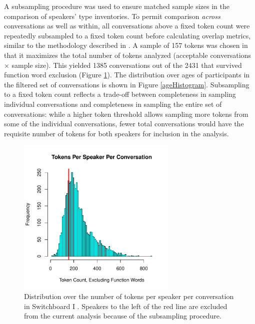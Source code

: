 \documentclass[10pt,letterpaper]{article}
\begin{document}
A subsampling procedure was used to ensure matched sample sizes in the comparison of speakers' type inventories. To permit comparison \textit{across} conversations as well as within, all conversations above a fixed token count were repeatedly subsampled to a fixed token count before calculating overlap metrics, similar to the methodology described in \citet{pineEtAl2013}. A sample of 157 tokens was chosen in that it maximizes the total number of tokens analyzed (acceptable conversations $\times$ sample size). This yielded 1385 conversations out of the 2431 that survived function word exclusion (Figure \ref{tokenHistogram}). The distribution over ages of participants in the filtered set of conversations is shown in Figure \ref{ageHistogram}. Subsampling to a fixed token count reflects a trade-off between completeness in sampling individual conversations and completeness in sampling the entire set of conversations: while a higher token threshold allows sampling more tokens from some of the individual conversations, fewer total conversations would have the requisite number of tokens for both speakers for inclusion in the analysis. 

\begin{figure}
\includegraphics[width=3in]{figures/tokenCountHistogram.pdf}
\caption{Distribution over the number of tokens per speaker per conversation in Switchboard I . Speakers to the left of the red line are excluded from the current analysis because of the subsampling procedure.} 
\label{tokenHistogram}
\end{figure}
\end{document}
